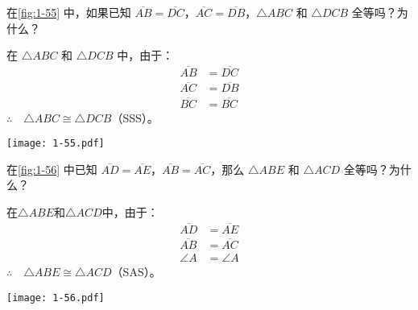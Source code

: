 \begin{example}
  在\cref{fig:1-55} 中，如果已知 $\overline{AB}=\overline{DC}$，$\overline{AC}=\overline{DB}$，$\triangle ABC$ 和 $\triangle DCB$ 全等吗？为什么？
\end{example}

\medskip\noindent
\begin{minipage}{0.6\linewidth}
	\begin{solution}
		在 $\triangle ABC$ 和 $\triangle DCB$ 中，由于：
		\begin{align*}
			\overline{AB}&=\overline{DC}  \tag{已知}\\
			\overline{AC}&=\overline{DB} \tag{已知}\\
			\overline{BC}&=\overline{BC}  \tag{公共边}	
		\end{align*}
		$\therefore\quad \triangle ABC\cong \triangle DCB$（SSS）。
	\end{solution}
\end{minipage}%
\begin{minipage}{0.4\linewidth}\centering
  \begin{figurehere}
		\texttt{[image: 1-55.pdf]}
		\caption{}\label{fig:1-55}
	\end{figurehere}
\end{minipage}

\begin{example}
在\cref{fig:1-56} 中已知 $\overline{AD}=\overline{AE}$，$\overline{AB}=\overline{AC}$，那么 $\triangle ABE$ 和 $\triangle ACD$ 全等吗？为什么？
\end{example}

\noindent
\begin{minipage}{0.6\linewidth}
	\begin{solution}
		在$\triangle ABE$和$\triangle ACD$中，由于：
		\begin{align*}
			\overline{AD}&=\overline{AE}  \tag{已知}\\
			\overline{AB}&=\overline{AC} \tag{已知}\\
			\angle A&=\angle A  \tag{公共角}	
		\end{align*}
	$\therefore\quad \triangle ABE\cong \triangle ACD$（SAS）。
	\end{solution}
\end{minipage}%
\begin{minipage}{0.4\linewidth}\centering
  \begin{figurehere}
		\texttt{[image: 1-56.pdf]}
		\caption{}\label{fig:1-56}
	\end{figurehere}
\end{minipage}

